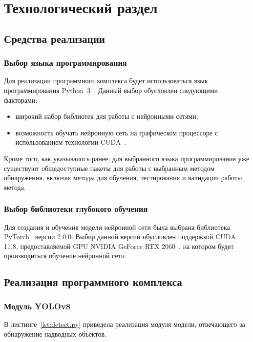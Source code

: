 \chapter{Технологический раздел}

\section{Средства реализации}

\subsection*{Выбор языка программирования}

Для реализации программного комплекса будет использоваться язык программирования Python~3~\cite{python3}. Данный выбор обусловлен следующими факторами:
\begin{itemize}[label=---]
    \item широкий набор библиотек для работы с нейронными сетями;
    \item возможность обучать нейронную сеть на графическом процессоре с
использованием технологии CUDA~\cite{cuda}.
\end{itemize}

Кроме того, как указывалось ранее, для выбранного языка программирования уже существуют общедоступные пакеты для работы с выбранным методом обнаружения, включая методы для обучения, тестирования и валидации работы метода.

\subsection*{Выбор библиотеки глубокого обучения}

Для создания и обучения модели нейронной сети была выбрана библиотека PyTorch~\cite{pytorch} версии 2.0.0. Выбор данной версии обусловлен поддержкой CUDA 11.8, предоставляемой GPU NVIDIA GeForce RTX 2060~\cite{rtx2060}, на котором будет производиться обучение нейронной сети.

\section{Реализация программного комплекса}

\subsection{Модуль YOLOv8}

В листинге~\ref{lst:detect.py} приведена реализация модуля модели, отвечающего за обнаружение надводных объектов.


